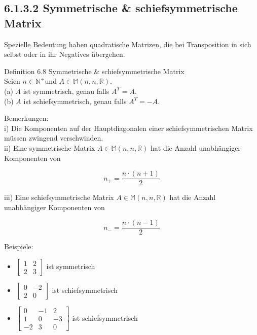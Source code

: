 \documentclass[10pt]{article}
\begin{document}
\subsection*{6.1.3.2 Symmetrische \& schiefsymmetrische Matrix}
Spezielle Bedeutung haben quadratische Matrizen, die bei Transposition in sich selbst oder in ihr Negatives übergehen.

Definition 6.8 Symmetrische \& schiefsymmetrische Matrix\\
Seien $n \in \mathbb{N}^{+}$und $A \in \mathbb{M}(n, n, \mathbb{R})$.\\
(a) $A$ ist symmetrisch, genau falls $A^{T}=A$.\\
(b) $A$ ist schiefsymmetrisch, genau falls $A^{T}=-A$.

Bemerkungen:\\
i) Die Komponenten auf der Hauptdiagonalen einer schiefsymmetrischen Matrix müssen zwingend verschwinden.\\
ii) Eine symmetrische Matrix $A \in \mathbb{M}(n, n, \mathbb{R})$ hat die Anzahl unabhängiger Komponenten von


\begin{equation*}
n_{+}=\frac{n \cdot(n+1)}{2} \tag{6.15}
\end{equation*}


iii) Eine schiefsymmetrische Matrix $A \in \mathbb{M}(n, n, \mathbb{R})$ hat die Anzahl unabhängiger Komponenten von


\begin{equation*}
n_{-}=\frac{n \cdot(n-1)}{2} \tag{6.16}
\end{equation*}


Beispiele:

\begin{itemize}
  \item $\left[\begin{array}{ll}1 & 2 \\ 2 & 3\end{array}\right]$ ist symmetrisch
  \item $\left[\begin{array}{rr}0 & -2 \\ 2 & 0\end{array}\right]$ ist schiefsymmetrisch
  \item $\left[\begin{array}{rrr}0 & -1 & 2 \\ 1 & 0 & -3 \\ -2 & 3 & 0\end{array}\right]$ ist schiefsymmetrisch
\end{itemize}
\end{document}

